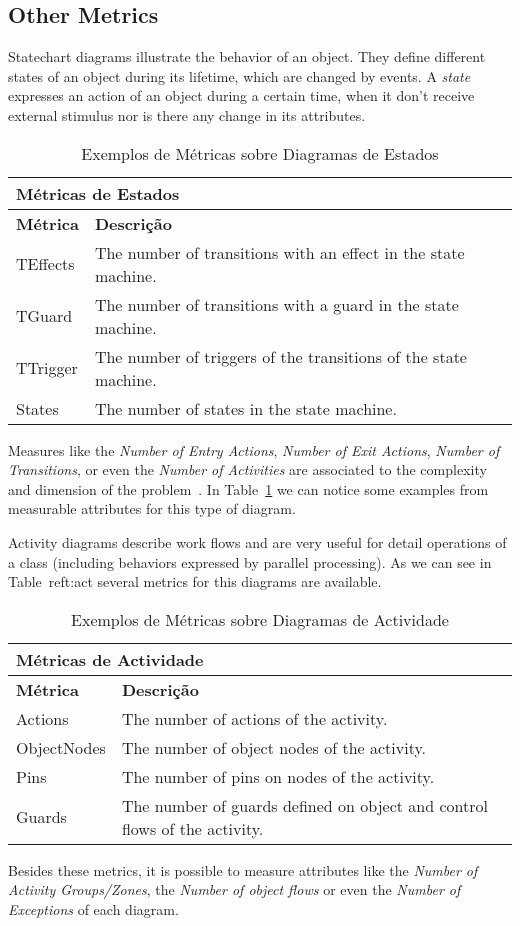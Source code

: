 \subsection{Other Metrics}

Statechart diagrams illustrate the behavior of an object.
They define different states of an object during its lifetime, which are changed by events.
A \emph{state} expresses an action of an object during a certain time, when it don't receive external stimulus nor is there any change in its attributes. 

\begin{table}[h]\centering
\begin{tabular}{ p{2cm} | p{}}
\multicolumn{2}{l}{\textbf{Métricas de Estados}} \\ \hline
\textbf{Métrica}  & \textbf{Descrição} \\ \hline
TEffects  & The number of transitions with an effect in the state machine. \\ \hline 
TGuard & The number of transitions with a guard in the state machine. \\ \hline 
TTrigger & The number of triggers of the transitions of the state machine. \\ \hline 
States & The number of states in the state machine. \\ \hline 
\end{tabular}
\caption{\small{Exemplos de Métricas sobre Diagramas de Estados}}
\label{t:estado}
\end{table}

Measures like the \emph{Number of Entry Actions}, \emph{Number of Exit Actions}, \emph{Number of Transitions}, or even the \emph{Number of Activities} are associated to the complexity and dimension of the problem~\cite{EVMmdm}.
In Table~\ref{t:estado} we can notice some examples from measurable attributes for this type of diagram.

Activity diagrams describe work flows and are very useful for detail operations of a class (including behaviors expressed by parallel processing).
As we can see in Table~ref{t:act} several metrics for this diagrams are available.

\begin{table}[h]\centering
\begin{tabular}{ p{2cm}|   p{}}
\multicolumn{2}{l}{\textbf{Métricas de Actividade}} \\ \hline
\textbf{Métrica} & \textbf{Descrição} \\ \hline
Actions  & The number of actions of the activity. \\ \hline 
ObjectNodes & The number of object nodes of the activity. \\ \hline 
Pins  & The number of pins on nodes of the activity. \\ \hline 
Guards  & The number of guards defined on object and control flows of the activity. \\ \hline 
\end{tabular}
\caption{\small{Exemplos de Métricas sobre Diagramas de Actividade}}
\label{t:act}
\end{table}

Besides these metrics, it is possible to measure attributes like the \emph{Number of Activity Groups/Zones}, the \emph{Number of object flows} or even the \emph{Number of Exceptions} of each diagram. 